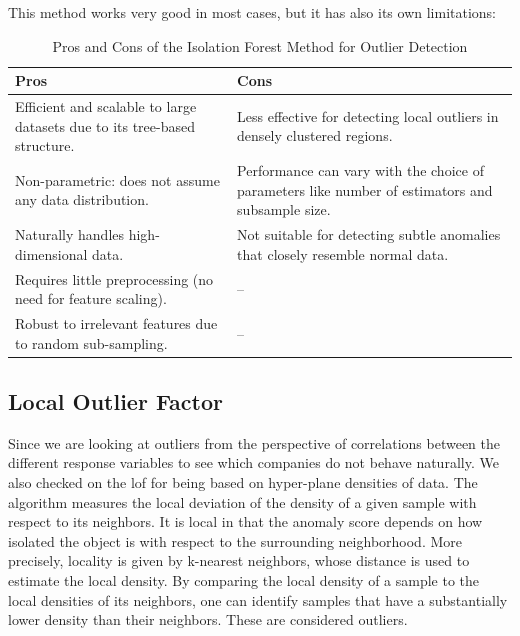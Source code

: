 \documentclass[11pt,english,a4paper,hidelinks]{book}
\begin{document}
\noindent This method works very good in most cases, but it has also its own limitations:

\begin{table}[H]
    \centering
    \begin{tabular}{p{7cm}p{7cm}}
    \toprule
    \textbf{Pros} & \textbf{Cons} \\
    \midrule
    Efficient and scalable to large datasets due to its tree-based structure. & Less effective for detecting local outliers in densely clustered regions. \\
    Non-parametric: does not assume any data distribution. & Performance can vary with the choice of parameters like number of estimators and subsample size. \\
    \hline
    Naturally handles high-dimensional data. & Not suitable for detecting subtle anomalies that closely resemble normal data. \\
    \hline
    Requires little preprocessing (no need for feature scaling). & -- \\
    \hline
    Robust to irrelevant features due to random sub-sampling. & -- \\
    \hline
    \end{tabular}
    \caption{Pros and Cons of the Isolation Forest Method for Outlier Detection}
\end{table}

\subsection{Local Outlier Factor}

Since we are looking at outliers from the perspective of correlations between the different response variables to see which companies do not behave naturally. We also checked on the \gls{lof} for being based on hyper-plane densities of data. The algorithm measures the local deviation of the density of a given sample with respect to its neighbors. It is local in that the anomaly score depends on how isolated the object is with respect to the surrounding neighborhood. More precisely, locality is given by k-nearest neighbors, whose distance is used to estimate the local density. By comparing the local density of a sample to the local densities of its neighbors, one can identify samples that have a substantially lower density than their neighbors. These are considered outliers. \cite{breunig2000lof}
\end{document}
